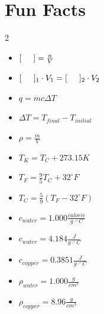 \documentclass[11pt,addpoints]{exam}   	%
\begin{document}
\section*{Fun Facts}
\begin{multicols}{2}
\begin{itemize}
\item 
$ [\hspace{0.2 in}] = \frac{n}{V}$

\item 
$ [\hspace{0.2 in}]_1 \cdot V_1=  [\hspace{0.2 in}]_2 \cdot V_2$

\item
$q = m c \Delta T$
\vspace{0.2in}

\item
$\Delta T = T_{final} - T_{initial}$
\vspace{0.2in}

\item
$\rho = \frac{m}{V} $
\vspace{0.2in}

\item
$T_K = T_C + 273.15 K$
\vspace{0.2in}

\item
$T_F = \frac{9}{5}T_C + 32^{\circ}F$
\vspace{0.2in}

\item
$T_C = \frac{5}{9}(T_F - 32^{\circ}F)$
\vspace{0.2in}

\item
$c_{water} = 1.000 \frac{calorie}{g \cdot ^{\circ}C}$
\vspace{0.2in}

\item
$c_{water} = 4.184 \frac{J}{g \cdot ^{\circ}C}$
\vspace{0.2in}

\item
$c_{copper} = 0.3851 \frac{J}{g \cdot ^{\circ}C}$
\vspace{0.2in}

\item
$\rho_{water} = 1.000 \frac{g}{cm^3}$
\vspace{0.2in}

\item
$\rho_{copper} = 8.96 \frac{g}{cm^3}$
\vspace{0.2in}


\end{itemize}
\end{multicols}
\end{document}
